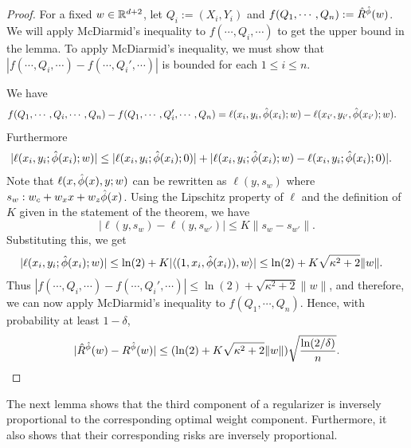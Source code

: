 \begin{proof}
    For a fixed $w \in \mathbb{R}^{d+2}$, let $Q_i := (X_i,Y_i)$ and $f(Q_1,\cdots,Q_n) := \hat{R}^{\hat{\phi}}(w)$. We will apply McDiarmid's inequality to $f(\cdots,Q_i,\cdots)$ to get the upper bound in the lemma. To apply McDiarmid's inequality, we must show that $|f(\cdots, Q_i,\cdots) - f(\cdots,Q_i',\cdots)|$ is bounded for each $1\leq i\leq n$.

    \noindent We have
    \begin{equation*}
    \begin{aligned}
        &f(Q_1,\cdots,Q_i,\cdots,Q_n) - f(Q_1,\cdots,Q_{i}',\cdots,Q_n) = \ell(x_i,y_i,\hat{\phi}(x_i);w) - \ell(x_{i'},y_{i'},\hat{\phi}(x_{i'});w).
    \end{aligned}
    \end{equation*}
Furthermore
    \begin{equation*}
    \begin{aligned}
        |\ell(x_i,y_i;\hat{\phi}(x_i);w)|
        &\leq  |\ell(x_i,y_i;\hat{\phi}(x_i);0)| + |\ell(x_i,y_i;\hat{\phi}(x_i);w) - \ell(x_i,y_i;\hat{\phi}(x_i);0)|.
    \end{aligned}
    \end{equation*}
    Note that $\ell(x,\hat{\phi}(x),y;w)$ can be rewritten as $\ell(y,s_w)$ where $s_w : w_c + w_x x + w_z\hat{\phi}(x)$. Using the Lipschitz property of $\ell$ and the definition of $K$ given in the statement of the theorem, we have 
    \begin{equation*}
        |\ell(y,s_w) - \ell(y,s_{w'})| \leq K\|s_w - s_{w'}\|.
    \end{equation*}
    Substituting this, we get
    \begin{equation*}
    \begin{aligned}
        |\ell(x_i,y_i;\hat{\phi}(x_i);w)|
        &\leq \ln(2) + K|\langle (1,x_i,\hat{\phi}(x_i)),w\rangle| \leq \ln(2) + K\sqrt{\kappa^2+2}\|w\|.
    \end{aligned}
    \end{equation*}
Thus $|f(\cdots, Q_i,\cdots) - f(\cdots,Q_i',\cdots)| \leq \ln(2) + \sqrt{\kappa^2+2}\|w\| $, and therefore, we can now apply McDiarmid's inequality to $f(Q_1,\cdots, Q_n)$. Hence, with probability at least $1-\delta$,
    \begin{equation*}
        |\hat{R}^{\hat{\phi}}(w) - R^{\hat{\phi}}(w)|
        \leq (\ln(2) + K\sqrt{\kappa^2 + 2}\|w\|)\sqrt{\frac{\ln(2/\delta)}{{n}}}.
    \end{equation*}
\end{proof}


The next lemma shows that the third component of a regularizer is inversely proportional to the corresponding optimal weight component. Furthermore, it also shows that their corresponding risks are inversely proportional.

